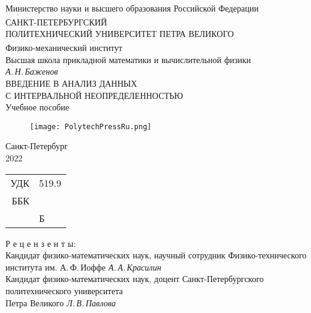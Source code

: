 \documentclass[a5paper,openany]{book}
\newcommand{\ov}{\overline}
\begin{document}

\begin{center}
	\hfill \break
Министерство науки и высшего образования  Российской Федерации\\
$\ov{~~~~~~~~~~~~~}$\\
	\normalsize{	САНКТ-ПЕТЕРБУРГСКИЙ \\
		ПОЛИТЕХНИЧЕСКИЙ УНИВЕРСИТЕТ ПЕТРА ВЕЛИКОГО}\\ 
$\ov{~~~~~~~~~~~~~~~~~~~~~~~~~~~~~~~~~~~~~~~~~~~~~~~~~~~~~~~~~~~~~~~~~~~~~~~~~~~~~~~~~~~~~~~~~~~~~~}$\\	
	{\small Физико-механический институт\\
	Высшая школа прикладной математики и вычислительной физики}\\
	\hfill \break
	\Large{\it А.\,Н.\,Баженов\\
		\hfill \break		\hfill \break		}
	{\Large	ВВЕДЕНИЕ В АНАЛИЗ ДАННЫХ\\
		С ИНТЕРВАЛЬНОЙ НЕОПРЕДЕЛЕННОСТЬЮ}\\
	\hfill \break 	\hfill \break	
	\Large{	Учебное пособие	
	}\\
\end{center}

		\hfill \break		\hfill \break	
\begin{figure}[h]
	\centering
	\texttt{[image: PolytechPressRu.png]}
\end{figure}
\begin{center}\Large{Санкт-Петербург \\
		2022} \end{center}
\thispagestyle{empty} %


\newpage
\begin{tabular}{rl}
	УДК & 519.9 \\	
	ББК  & ~~~\\
	~~~ & Б
\end{tabular}


\begin{center}
Р е ц е н з е н т ы:\\

Кандидат физико-математических наук, научный сотрудник Физико-технического института им. А.\,Ф.\,Иоффе
{\it А.\,А.\,Красилин}\\
Кандидат физико-математических наук, доцент Санкт-Петербургского политехнического  университета \\ Петра Великого {\it Л.\,В.\,Павлова}
 \end{center}
\end{document}
